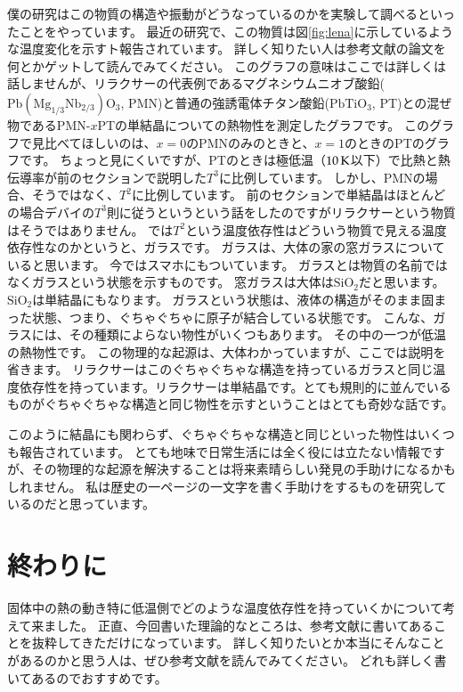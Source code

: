 \documentclass[10pt,b5paper,papersize,dvipdfmx]{jsbook}
\begin{document}
僕の研究はこの物質の構造や振動がどうなっているのかを実験して調べるといったことをやっています。
最近の研究で、この物質は図\ref{fig:lena}に示しているような温度変化を示すト報告されています。
詳しく知りたい人は参考文献\cite{relaxCT}の論文を何とかゲットして読んでみてください。
このグラフの意味はここでは詳しくは話しませんが、リラクサーの代表例であるマグネシウムニオブ酸鉛($\mathrm{Pb(Mg_{1/3}Nb_{2/3})O_3}$, PMN)と普通の強誘電体チタン酸鉛($\mathrm{PbTiO_3}$, PT)との混ぜ物であるPMN-$x$PTの単結晶についての熱物性を測定したグラフです。
このグラフで見比べてほしいのは、$x = 0$のPMNのみのときと、$x = 1$のときのPTのグラフです。
ちょっと見にくいですが、PTのときは極低温（$10\tani{K}$以下）で比熱と熱伝導率が前のセクションで説明した$T^3$に比例しています。
しかし、PMNの場合、そうではなく、$T^2$に比例しています。
前のセクションで単結晶はほとんどの場合デバイの$T^3$則に従うというという話をしたのですがリラクサーという物質はそうではありません。
では$T^2$という温度依存性はどういう物質で見える温度依存性なのかというと、ガラスです。
ガラスは、大体の家の窓ガラスについていると思います。
今ではスマホにもついています。
ガラスとは物質の名前ではなくガラスという状態を示すものです。
窓ガラスは大体は$\mathrm{SiO}_2$だと思います。
$\mathrm{SiO}_2$は単結晶にもなります。
ガラスという状態は、液体の構造がそのまま固まった状態、つまり、ぐちゃぐちゃに原子が結合している状態です。
こんな、ガラスには、その種類によらない物性がいくつもあります。
その中の一つが低温の熱物性です。
この物理的な起源は、大体わかっていますが、ここでは説明を省きます。
リラクサーはこのぐちゃぐちゃな構造を持っているガラスと同じ温度依存性を持っています。リラクサーは単結晶です。とても規則的に並んでいるものがぐちゃぐちゃな構造と同じ物性を示すということはとても奇妙な話です。\par
このように結晶にも関わらず、ぐちゃぐちゃな構造と同じといった物性はいくつも報告されています。
とても地味で日常生活には全く役には立たない情報ですが、その物理的な起源を解決することは将来素晴らしい発見の手助けになるかもしれません。
私は歴史の一ページの一文字を書く手助けをするものを研究しているのだと思っています。


\section{終わりに}
固体中の熱の動き特に低温側でどのような温度依存性を持っていくかについて考えて来ました。
正直、今回書いた理論的なところは、参考文献に書いてあることを抜粋してきただけになっています。
詳しく知りたいとか本当にそんなことがあるのかと思う人は、ぜひ参考文献を読んでみてください。
どれも詳しく書いてあるのでおすすめです。
\end{document}
